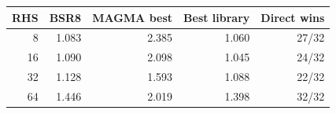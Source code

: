 \begin{tabular}{rrrrr}
\toprule
RHS & BSR8 & MAGMA best & Best library & Direct wins\\
\midrule
8 & 1.083 & 2.385 & 1.060 & 27/32\\
16 & 1.090 & 2.098 & 1.045 & 24/32\\
32 & 1.128 & 1.593 & 1.088 & 22/32\\
64 & 1.446 & 2.019 & 1.398 & 32/32\\
\bottomrule
\end{tabular}
